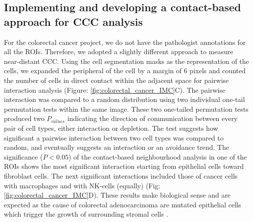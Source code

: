 \subsection{Implementing and developing a contact-based approach for CCC analysis}
For the colorectal cancer project, we do not have the pathologist annotations for all the ROIs. Therefore, we adopted a slightly different approach to measure near-distant CCC. Using the cell segmentation masks as the representation of the cells, we expanded the peripheral of the cell by a margin of 6 pixels and counted the number of cells in direct contact within the adjacent space for pairwise interaction analysis (Figure: \ref{fig:colorectal_cancer_IMC}C). The pairwise interaction was compared to a random distribution using two individual one-tail permutation tests within the same image. These two one-tailed permutation tests produced two $P_{values}$ indicating the direction of communication between every pair of cell types, either interaction or depletion. The test suggests how significant a pairwise interaction between two cell types was compared to random, and eventually suggests an interaction or an avoidance trend. The significance ($P<0.05$) of the contact-based neighbourhood analysis in one of the ROIs shows the most significant interaction starting from epithelial cells toward fibroblast cells. The next significant interactions included those of cancer cells with macrophages and with NK-cells (equally) (Fig: \ref{fig:colorectal_cancer_IMC}D). These results make biological sense and are expected as the cause of colorectal adenocarcinoma are mutated epithelial cells which trigger the growth of surrounding stromal cells \cite{bremnes2011role}. 


